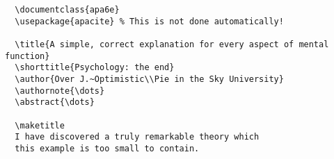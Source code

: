 \begin{verbatim}
  \documentclass{apa6e}
  \usepackage{apacite} % This is not done automatically!
  
  \title{A simple, correct explanation for every aspect of mental function}
  \shorttitle{Psychology: the end}
  \author{Over J.~Optimistic\\Pie in the Sky University}
  \authornote{\dots}
  \abstract{\dots}
  
  \maketitle
  I have discovered a truly remarkable theory which
  this example is too small to contain.
  
  
\end{verbatim}
